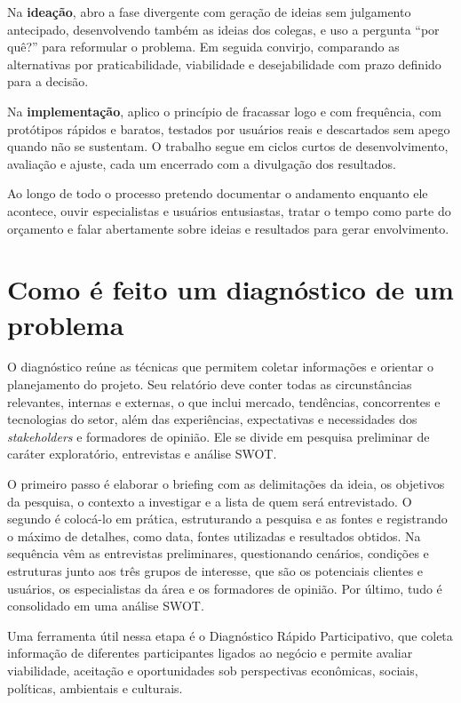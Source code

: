 \documentclass[11pt]{ifscarticle}
\begin{document}
Na \textbf{ideação}, abro a fase divergente com geração de ideias sem
julgamento antecipado, desenvolvendo também as ideias dos colegas, e uso a
pergunta ``por quê?'' para reformular o problema. Em seguida convirjo,
comparando as alternativas por praticabilidade, viabilidade e desejabilidade
com prazo definido para a decisão.

Na \textbf{implementação}, aplico o princípio de fracassar logo e com
frequência, com protótipos rápidos e baratos, testados por usuários reais e
descartados sem apego quando não se sustentam. O trabalho segue em ciclos
curtos de desenvolvimento, avaliação e ajuste, cada um encerrado com a
divulgação dos resultados.

Ao longo de todo o processo pretendo documentar o andamento enquanto ele
acontece, ouvir especialistas e usuários entusiastas, tratar o tempo como
parte do orçamento e falar abertamente sobre ideias e resultados para gerar
envolvimento.

\section{Como é feito um diagnóstico de um problema}

O diagnóstico reúne as técnicas que permitem coletar informações e orientar
o planejamento do projeto. Seu relatório deve conter todas as circunstâncias
relevantes, internas e externas, o que inclui mercado, tendências,
concorrentes e tecnologias do setor, além das experiências, expectativas e
necessidades dos \textit{stakeholders} e formadores de opinião. Ele se
divide em pesquisa preliminar de caráter exploratório, entrevistas e análise
SWOT.

O primeiro passo é elaborar o briefing com as delimitações da ideia, os
objetivos da pesquisa, o contexto a investigar e a lista de quem será
entrevistado. O segundo é colocá-lo em prática, estruturando a pesquisa e as
fontes e registrando o máximo de detalhes, como data, fontes utilizadas e
resultados obtidos. Na sequência vêm as entrevistas preliminares,
questionando cenários, condições e estruturas junto aos três grupos de
interesse, que são os potenciais clientes e usuários, os especialistas da
área e os formadores de opinião. Por último, tudo é consolidado em uma
análise SWOT.

Uma ferramenta útil nessa etapa é o Diagnóstico Rápido Participativo, que
coleta informação de diferentes participantes ligados ao negócio e permite
avaliar viabilidade, aceitação e oportunidades sob perspectivas econômicas,
sociais, políticas, ambientais e culturais.
\end{document}
